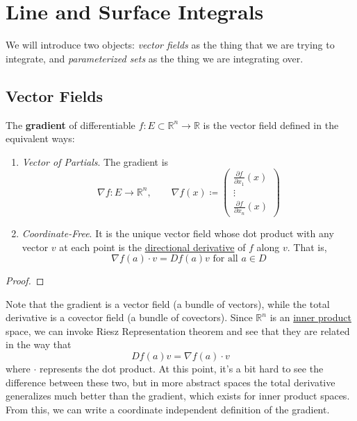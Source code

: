 \section{Line and Surface Integrals}

	We will introduce two objects: \textit{vector fields} as the thing that we are trying to integrate, and \textit{parameterized sets} as the thing we are integrating over. 
	
\subsection{Vector Fields}

  \begin{definition}[Gradient]
    \label{def:gradient}
		The \textbf{gradient} of differentiable $f: E \subset \mathbb{R}^n \to \mathbb{R}$ is the vector field defined in the equivalent ways: 
		\begin{enumerate}
		  \item \textit{Vector of Partials}. The gradient is
				\begin{equation}
					\nabla f: E \to \mathbb{R}^n, \qquad \nabla f(x) \coloneqq \begin{pmatrix} \frac{\partial f}{\partial x_1} (x) \\ \vdots \\ \frac{\partial f}{\partial x_n} (x) \end{pmatrix}
				\end{equation}

			\item \textit{Coordinate-Free}. It is the unique vector field whose dot product with any vector $v$ at each point is the \hyperref[def:directional-derivative]{directional derivative} of $f$ along $v$. That is, 
				\begin{equation}
					\nabla f(a) \cdot v = D f(a) v \text{ for all } a \in D
				\end{equation}
		\end{enumerate}
  \end{definition}
	\begin{proof}
	  
	\end{proof}

  Note that the gradient is a vector field (a bundle of vectors), while the total derivative is a covector field (a bundle of covectors). Since $\mathbb{R}^n$ is an \hyperref[lin-def:inner-product]{inner product} space, we can invoke Riesz Representation theorem and see that they are related in the way that 
	\begin{equation}
  	D f(a) v = \nabla f (a) \cdot v
	\end{equation}
  where $\cdot$ represents the dot product. At this point, it's a bit hard to see the difference between these two, but in more abstract spaces the total derivative generalizes much better than the gradient, which exists for inner product spaces. From this, we can write a coordinate independent definition of the gradient. 


